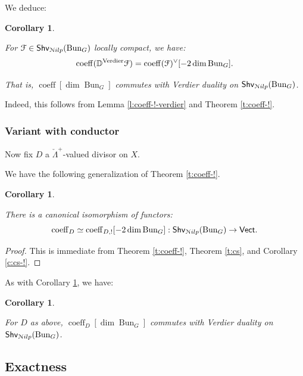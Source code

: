 \documentclass[reqno,11pt]{amsart}
\numberwithin{equation}{subsection}
\newtheorem{cor}[thm]{Corollary}
\theoremstyle{remark}
\newcommand{\bD}{{\mathbb D}}
\newcommand{\sF}{{\EuScript F}}
\newcommand{\sN}{{\EuScript N}}
\newcommand{\on}{\operatorname}
\newcommand{\Vect}{\mathsf{Vect}}
\newcommand{\Bun}{\on{Bun}}
\newcommand{\coeff}{\on{coeff}}
\newcommand{\Shv}{\mathsf{Shv}}
\newcommand{\Nilp}{\sN ilp}
\begin{document}
\subsubsection{}

We deduce:

\begin{cor}\label{c:coeff-duality}

For $\sF \in \Shv_{\Nilp}(\Bun_G)$ locally compact, we have:
%
\[
\coeff(\bD^{\on{Verdier}} \sF) = \coeff(\sF)^{\vee}[-2\dim\Bun_G].
\]

\noindent That is, $\coeff[\dim \Bun_G]$ commutes with Verdier duality
on $\Shv_{\Nilp}(\Bun_G)$.

\end{cor}

Indeed, this follows from Lemma \ref{l:coeff-!-verdier} and Theorem \ref{t:coeff-!}.

\subsubsection{Variant with conductor}

Now fix $D$ a $\check{\Lambda}^+$-valued divisor on $X$. 

We have the following generalization of Theorem \ref{t:coeff-!}.

\begin{cor}\label{c:coeff-!-D}

There is a canonical isomorphism of functors:
%
\[
\coeff_D \simeq \coeff_{D,!}[-2\dim\Bun_G]:\Shv_{\Nilp}(\Bun_G) \to \Vect.
\]

\end{cor}

\begin{proof}

This is immediate from Theorem \ref{t:coeff-!}, Theorem \ref{t:cs}, and 
Corollary \ref{c:cs-!}.

\end{proof}

As with Corollary \ref{c:coeff-duality}, we have:

\begin{cor}\label{c:coeff-d-duality}

For $D$ as above, $\coeff_D[\dim \Bun_G]$ commutes with 
Verdier duality on $\Shv_{\Nilp}(\Bun_G)$.

\end{cor}

\subsection{Exactness}
\end{document}
